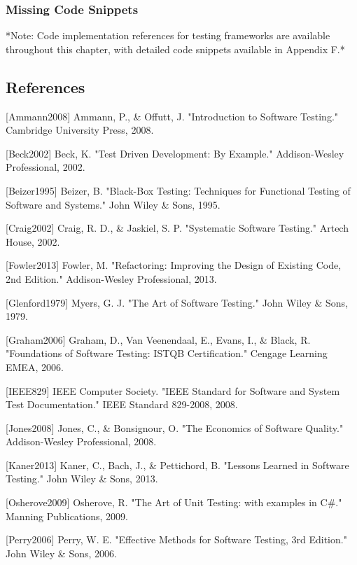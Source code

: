 \documentclass[12pt,a4paper]{article}
\begin{document}
\subsubsection{Missing Code Snippets}

*Note: Code implementation references for testing frameworks are available throughout this chapter, with detailed code
snippets available in Appendix F.*

\subsection{References}

[Ammann2008] Ammann, P., \& Offutt, J. "Introduction to Software Testing." Cambridge University Press, 2008.

[Beck2002] Beck, K. "Test Driven Development: By Example." Addison-Wesley Professional, 2002.

[Beizer1995] Beizer, B. "Black-Box Testing: Techniques for Functional Testing of Software and Systems." John Wiley \&
Sons, 1995.

[Craig2002] Craig, R. D., \& Jaskiel, S. P. "Systematic Software Testing." Artech House, 2002.

[Fowler2013] Fowler, M. "Refactoring: Improving the Design of Existing Code, 2nd Edition." Addison-Wesley Professional,
2013.

[Glenford1979] Myers, G. J. "The Art of Software Testing." John Wiley \& Sons, 1979.

[Graham2006] Graham, D., Van Veenendaal, E., Evans, I., \& Black, R. "Foundations of Software Testing: ISTQB
Certification." Cengage Learning EMEA, 2006.

[IEEE829] IEEE Computer Society. "IEEE Standard for Software and System Test Documentation." IEEE Standard 829-2008,
2008.

[Jones2008] Jones, C., \& Bonsignour, O. "The Economics of Software Quality." Addison-Wesley Professional, 2008.

[Kaner2013] Kaner, C., Bach, J., \& Pettichord, B. "Lessons Learned in Software Testing." John Wiley \& Sons, 2013.

[Osherove2009] Osherove, R. "The Art of Unit Testing: with examples in C\#." Manning Publications, 2009.

[Perry2006] Perry, W. E. "Effective Methods for Software Testing, 3rd Edition." John Wiley \& Sons, 2006.
\end{document}
